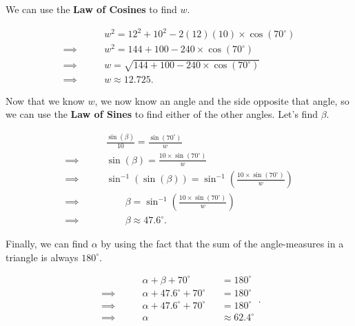 \begin{solution}
	\label{sol:law_of_cosines}

	We can use the \textbf{Law of Cosines} to find $w$.

	\begin{align*}
		\qquad         & w^{2} = 12^{2} + 10^{2} - 2(12)(10) \times \cos(70^{\circ}) \\
		\implies\qquad & w^{2} = 144 + 100 - 240 \times \cos(70^{\circ})             \\
		\implies\qquad & w = \sqrt{144 + 100 - 240 \times \cos(70^{\circ})}          \\
		\implies\qquad & w \approx 12.725
		.\end{align*}

	Now that we know $w$, we now know an angle and the side opposite that angle,
	so we can use the \textbf{Law of Sines} to find either of the other angles.
	Let's find $\beta$.

	\begin{align*}
		\qquad         & \frac{\sin (\beta)}{10} = \frac{\sin (70^{\circ})}{w}                                   \\
		\implies\qquad & \sin (\beta) = \frac{10 \times \sin (70^{\circ})}{w}                                    \\
		\implies\qquad & \sin^{-1} (\sin (\beta)) = \sin^{-1} \left(\frac{10 \times \sin (70^{\circ})}{w}\right) \\
		\implies\qquad & \qquad\beta = \sin^{-1} \left(\frac{10 \times \sin (70^{\circ})}{w}\right)              \\
		\implies\qquad & \qquad\beta \approx 47.6^{\circ}
		.\end{align*}

	Finally, we can find $\alpha$ by using the fact that the sum of the
	angle-measures in a triangle is always $180^{\circ}$.

	\begin{equation*}
		\begin{alignedat}{3}
			\qquad&\alpha + \beta + 70^{\circ} &&= 180^{\circ} \\
			\implies\qquad&\alpha + 47.6^{\circ} + 70^{\circ} &&= 180^{\circ} \\
			\implies\qquad&\alpha + 47.6^{\circ} + 70^{\circ} &&= 180^{\circ} \\
			\implies\qquad&\alpha &&\approx 62.4^{\circ} \\
		\end{alignedat}
		.\end{equation*}


\end{solution}
